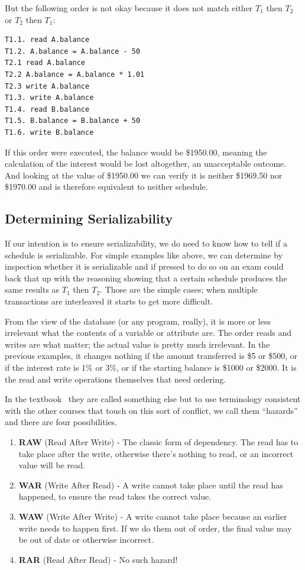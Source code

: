 But the following order is not okay because it does not match either $T_{1}$ then $T_{2}$ or $T_{2}$ then $T_{1}$:

\begin{verbatim}
T1.1. read A.balance
T1.2. A.balance = A.balance - 50
T2.1 read A.balance
T2.2 A.balance = A.balance * 1.01
T2.3 write A.balance
T1.3. write A.balance
T1.4. read B.balance
T1.5. B.balance = B.balance + 50
T1.6. write B.balance
\end{verbatim}

If this order were executed, the balance would be \$1950.00, meaning the calculation of the interest would be lost altogether, an unacceptable outcome. And looking at the value of \$1950.00 we can verify it is neither \$1969.50 nor \$1970.00 and is therefore equivalent to neither schedule. 

\subsection*{Determining Serializability}

If our intention is to ensure serializability, we do need to know how to tell if a schedule is serializable. For simple examples like above, we can determine by inspection whether it is serializable and if pressed to do so on an exam could back that up with the reasoning showing that a certain schedule produces the same results as $T_{1}$ then $T_{2}$. Those are the simple cases; when multiple transactions are interleaved it starts to get more difficult.

From the view of the database (or any program, really), it is more or less irrelevant what the contents of a variable or attribute are. The order reads and writes are what matter; the actual value is pretty much irrelevant. In the previous examples, it changes nothing if the amount transferred is \$5 or \$500, or if the interest rate is 1\% or 3\%, or if the starting balance is \$1000 or \$2000. It is the read and write operations themselves that need ordering.

In the textbook~\cite{dsc} they are called something else but to use terminology consistent with the other courses that touch on this sort of conflict, we call them ``hazards'' and there are four possibilities.

\begin{enumerate}
	\item \textbf{RAW} (Read After Write) - The classic form of dependency. The read has to take place after the write, otherwise there's nothing to read, or an incorrect value will be read.
	\item \textbf{WAR} (Write After Read) - A write cannot take place until the read has happened, to ensure the read takes the correct value.
	\item \textbf{WAW} (Write After Write) - A write cannot take place because an earlier write needs to happen first. If we do them out of order, the final value may be out of date or otherwise incorrect.
	\item \textbf{RAR} (Read After Read) - No such hazard! 
\end{enumerate}


